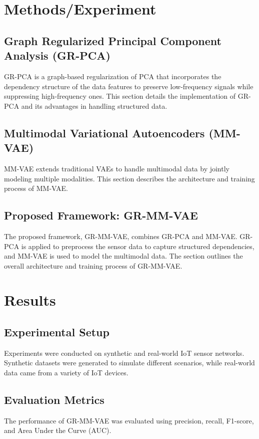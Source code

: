 \documentclass[12pt]{article}
\begin{document}
\section{Methods/Experiment}
\label{sec:methods}
\subsection{Graph Regularized Principal Component Analysis (GR-PCA)}
GR-PCA is a graph-based regularization of PCA that incorporates the dependency structure of the data features to preserve low-frequency signals while suppressing high-frequency ones. This section details the implementation of GR-PCA and its advantages in handling structured data.

\subsection{Multimodal Variational Autoencoders (MM-VAE)}
MM-VAE extends traditional VAEs to handle multimodal data by jointly modeling multiple modalities. This section describes the architecture and training process of MM-VAE.

\subsection{Proposed Framework: GR-MM-VAE}
The proposed framework, GR-MM-VAE, combines GR-PCA and MM-VAE. GR-PCA is applied to preprocess the sensor data to capture structured dependencies, and MM-VAE is used to model the multimodal data. The section outlines the overall architecture and training process of GR-MM-VAE.

\section{Results}
\label{sec:results}
\subsection{Experimental Setup}
Experiments were conducted on synthetic and real-world IoT sensor networks. Synthetic datasets were generated to simulate different scenarios, while real-world data came from a variety of IoT devices.

\subsection{Evaluation Metrics}
The performance of GR-MM-VAE was evaluated using precision, recall, F1-score, and Area Under the Curve (AUC).
\end{document}
